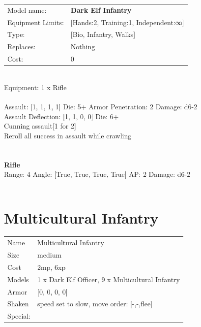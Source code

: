 {\noindent
\begin{tabular}{ll}
Model name: &{\bf Dark Elf Infantry } \\
Equipment Limits: &[Hands:2, Training:1, Independent:∞] \\
Type: &[Bio, Infantry, Walks] \\
Replaces: &Nothing \\
Cost: & 0\\
\end{tabular}
\ \\
Equipment: 1 x Rifle \\
\ \\
Assault: [1, 1, 1, 1] Die: 5+ Armor Penetration: 2 Damage: d6-2 \\
Assault Deflection: [1, 1, 0, 0] Die: 6+\\
\indent Cunning assault[1 for 2]\\ 
Reroll all success in assault while crawling\\ 
 
\ \\

\ \\
{\bf Rifle } \\



Range: 4  Angle: [True, True, True, True] AP: 2 Damage: d6-2 \\




 
\ \\













\clearpage

\section{ Multicultural Infantry }

\begin{tabular}{ll}
  Name & Multicultural Infantry \\
  Size & medium\\
  Cost & 2mp, 6xp\\
  Models & 1 x Dark Elf Officer, 9 x Multicultural Infantry\\
  Armor & [0, 0, 0, 0]\\
  Shaken & speed set to slow, move order: [-,-,flee]\\
  Special: \\
\end{tabular}

}
